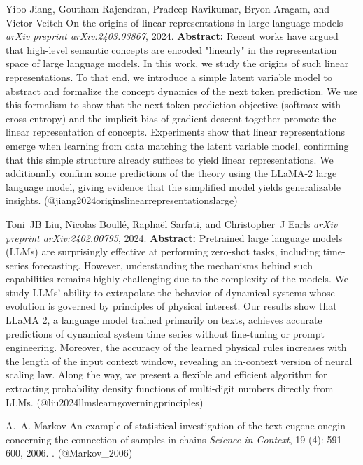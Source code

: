 \documentclass{article} %
\begin{document}
\begin{thebibliography}{}
 Yibo Jiang, Goutham Rajendran, Pradeep Ravikumar, Bryon Aragam, and Victor Veitch \newblock On the origins of linear representations in large language models \newblock \emph{arXiv preprint arXiv:2403.03867}, 2024. \newblock \textbf{Abstract:} Recent works have argued that high-level semantic concepts are encoded "linearly" in the representation space of large language models. In this work, we study the origins of such linear representations. To that end, we introduce a simple latent variable model to abstract and formalize the concept dynamics of the next token prediction. We use this formalism to show that the next token prediction objective (softmax with cross-entropy) and the implicit bias of gradient descent together promote the linear representation of concepts. Experiments show that linear representations emerge when learning from data matching the latent variable model, confirming that this simple structure already suffices to yield linear representations. We additionally confirm some predictions of the theory using the LLaMA-2 large language model, giving evidence that the simplified model yields generalizable insights. \newblock (@jiang2024originslinearrepresentationslarge)

 Toni~JB Liu, Nicolas Boull{\'e}, Rapha{\"e}l Sarfati, and Christopher~J Earls  \newblock \emph{arXiv preprint arXiv:2402.00795}, 2024. \newblock \textbf{Abstract:} Pretrained large language models (LLMs) are surprisingly effective at performing zero-shot tasks, including time-series forecasting. However, understanding the mechanisms behind such capabilities remains highly challenging due to the complexity of the models. We study LLMs' ability to extrapolate the behavior of dynamical systems whose evolution is governed by principles of physical interest. Our results show that LLaMA 2, a language model trained primarily on texts, achieves accurate predictions of dynamical system time series without fine-tuning or prompt engineering. Moreover, the accuracy of the learned physical rules increases with the length of the input context window, revealing an in-context version of neural scaling law. Along the way, we present a flexible and efficient algorithm for extracting probability density functions of multi-digit numbers directly from LLMs. \newblock (@liu2024llmslearngoverningprinciples)

 A.~A. Markov \newblock An example of statistical investigation of the text eugene onegin concerning the connection of samples in chains \newblock \emph{Science in Context}, 19 (4): 591–600, 2006. \newblock {}. \newblock (@Markov\_2006)


\end{thebibliography}
\end{document}
